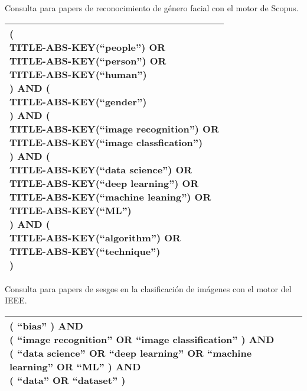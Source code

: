 \begin{table}[Consulta género - Scopus]{}{Consulta para papers de reconocimiento de género facial con el motor de Scopus.}
    \small
    \begin{tabular}{|l|}
    \hline
        \makecell[l]{( \\
            TITLE-ABS-KEY(``people'') OR \\
            TITLE-ABS-KEY(``person'') OR \\
            TITLE-ABS-KEY(``human'') \\
        ) AND ( \\
            TITLE-ABS-KEY(``gender'') \\
        ) AND ( \\
            TITLE-ABS-KEY(``image recognition'') OR \\
            TITLE-ABS-KEY(``image classfication'') \\
        ) AND ( \\
            TITLE-ABS-KEY(``data science'') OR \\
            TITLE-ABS-KEY(``deep learning'') OR \\
            TITLE-ABS-KEY(``machine leaning'') OR \\
            TITLE-ABS-KEY(``ML'') \\
        ) AND ( \\
            TITLE-ABS-KEY(``algorithm'') OR \\
            TITLE-ABS-KEY(``technique'') \\
        )} \\
    \hline
    \end{tabular}
\end{table}

\begin{table}[Consulta sesgo - IEEE 1]{}{Consulta para papers de sesgos en la clasificación de imágenes con el motor del IEEE.}
    \small
    \begin{tabular}{|l|}
    \hline
        \makecell[l]{( ``bias'' ) AND \\
        ( ``image recognition'' OR ``image classification'' ) AND \\
        ( ``data science'' OR ``deep learning'' OR ``machine learning'' OR ``ML'' ) AND \\
        ( ``data'' OR ``dataset'' )} \\
    \hline
    \end{tabular}
\end{table}

